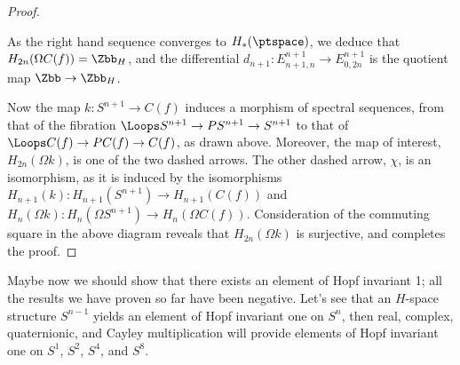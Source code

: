 \begin{proof}
\begin{center}
\end{center}
As the right hand sequence converges to $H_*(\ptspace)$, we deduce that $H_{2n}(\Omega C(f))=\Zbb_H$, and the differential $d_{n+1}:E^{n+1}_{n+1,n}\to E^{n+1}_{0,2n}$ is the quotient map $\Zbb\to\Zbb_H$.

Now the map $k:S^{n+1}\to C(f)$ induces a morphism of spectral sequences,  from that of the fibration $\Loops S^{n+1} \to PS^{n+1} \to S^{n+1}$ to that of $\Loops C(f) \to PC(f) \to C(f)$, as drawn above. Moreover, the map of interest, $H_{2n}(\Omega k)$, is one of the two dashed arrows. The other dashed arrow, $\chi$, is an isomorphism, as it is induced by the isomorphisms $H_{n+1}(k):H_{n+1}(S^{n+1})\to H_{n+1}(C(f))$ and $H_{n}(\Omega k):H_n(\Omega S^{n+1})\to H_n(\Omega C(f))$. Consideration of the commuting square in the above diagram reveals that $H_{2n}(\Omega k)$ is surjective, and completes the proof.
\end{proof}

Maybe now we should show that there exists an element of Hopf invariant 1; all the results we have proven so far have been negative.  Let's see that an $H$-space structure $S^{n-1}$ yields an element of Hopf invariant one on $S^n$, then real, complex, quaternionic, and Cayley multiplication will provide elements of Hopf invariant one on $S^1$, $S^2$, $S^4$, and $S^8$.

